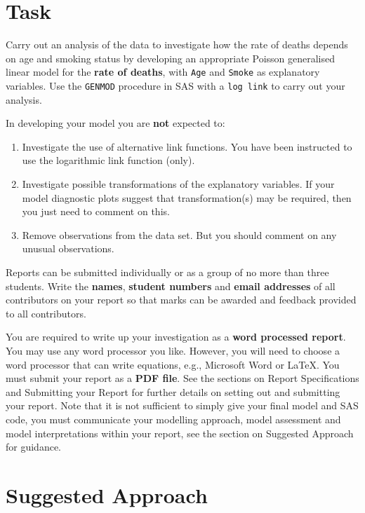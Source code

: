 \documentclass[11pt,a4paper]{article}
\begin{document}
\newpage
\section*{Task}

Carry out an analysis of the data to investigate how the rate of deaths depends on age and smoking status by developing an appropriate Poisson generalised linear model for the \textbf{rate of deaths}, with \texttt{Age} and \texttt{Smoke} as explanatory variables.  Use the \texttt{GENMOD} procedure in SAS with a \texttt{log link} to carry out your analysis.

In developing your model you are \textbf{not} expected to:
\begin{enumerate}
    \item Investigate the use of alternative link functions.  You have been instructed to use the logarithmic link function (only).
    \item Investigate possible transformations of the explanatory variables.  If your model diagnostic plots suggest that transformation(s) may be required, then you just need to comment on this.
    \item Remove observations from the data set.  But you should comment on any unusual observations.
\end{enumerate}

Reports can be submitted individually or as a group of no more than three students.  Write the \textbf{names}, \textbf{student numbers} and \textbf{email addresses} of all contributors on your report so that marks can be awarded and feedback provided to all contributors.

You are required to write up your investigation as a \textbf{word processed report}.  You may use any word processor you like.  However, you will need to choose a word processor that can write equations, e.g., Microsoft Word or LaTeX.  You must submit your report as a \textbf{PDF file}.  See the sections on Report Specifications and Submitting your Report for further details on setting out and submitting your report.  Note that it is not sufficient to simply give your final model and SAS code, you must communicate your modelling approach, model assessment and model interpretations within your report, see the section on Suggested Approach for guidance.


\newpage
\section*{Suggested Approach}
\end{document}
